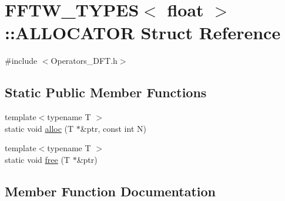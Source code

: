 \hypertarget{struct_f_f_t_w___t_y_p_e_s_3_01float_01_4_1_1_a_l_l_o_c_a_t_o_r}{}\section{F\+F\+T\+W\+\_\+\+T\+Y\+P\+E\+S$<$ float $>$\+:\+:A\+L\+L\+O\+C\+A\+T\+O\+R Struct Reference}
\label{struct_f_f_t_w___t_y_p_e_s_3_01float_01_4_1_1_a_l_l_o_c_a_t_o_r}


{\ttfamily \#include $<$Operators\+\_\+\+D\+F\+T.\+h$>$}

\subsection*{Static Public Member Functions}
\begin{DoxyCompactItemize}
\item 
{\footnotesize template$<$typename T $>$ }\\static void \hyperlink{struct_f_f_t_w___t_y_p_e_s_3_01float_01_4_1_1_a_l_l_o_c_a_t_o_r_a825d8e4a10e1eccb40d419216aeb1628}{alloc} (T $\ast$\&ptr, const int N)
\item 
{\footnotesize template$<$typename T $>$ }\\static void \hyperlink{struct_f_f_t_w___t_y_p_e_s_3_01float_01_4_1_1_a_l_l_o_c_a_t_o_r_a103673702cacc6a2a03932ca38a1916a}{free} (T $\ast$\&ptr)
\end{DoxyCompactItemize}


\subsection{Member Function Documentation}
\hypertarget{struct_f_f_t_w___t_y_p_e_s_3_01float_01_4_1_1_a_l_l_o_c_a_t_o_r_a825d8e4a10e1eccb40d419216aeb1628}{}
